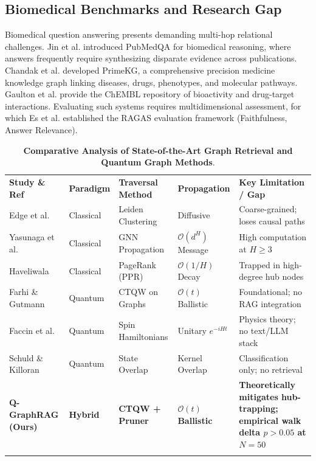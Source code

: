 \documentclass{llncs}
\begin{document}
\subsection{Biomedical Benchmarks and Research Gap}
Biomedical question answering presents demanding multi-hop relational challenges. Jin et al. \cite{jin2019pubmedqa} introduced PubMedQA for biomedical reasoning, where answers frequently require synthesizing disparate evidence across publications. Chandak et al. \cite{chandak2023building} developed PrimeKG, a comprehensive precision medicine knowledge graph linking diseases, drugs, phenotypes, and molecular pathways. Gaulton et al. \cite{gaulton2012chembl} provide the ChEMBL repository of bioactivity and drug-target interactions. Evaluating such systems requires multidimensional assessment, for which Es et al. \cite{es2023ragas} established the RAGAS evaluation framework (Faithfulness, Answer Relevance).

\begin{table}[t]
\centering
\small
\caption{\textbf{Comparative Analysis of State-of-the-Art Graph Retrieval and Quantum Graph Methods}.}
\label{tab:literature_survey}
\begin{tabular}{p{2.8cm}p{1.6cm}p{2.2cm}p{2.2cm}p{2.8cm}}
\hline\noalign{\smallskip}
\textbf{Study \& Ref} & \textbf{Paradigm} & \textbf{Traversal Method} & \textbf{Propagation} & \textbf{Key Limitation / Gap} \\
\noalign{\smallskip}\hline\noalign{\smallskip}
Edge et al. \cite{edge2024graphrag} & Classical & Leiden Clustering & Diffusive & Coarse-grained; loses causal paths \\
Yasunaga et al. \cite{yasunaga2021qagnn} & Classical & GNN Propagation & $\mathcal{O}(d^H)$ Message & High computation at $H \ge 3$ \\
Haveliwala \cite{haveliwala2002topic} & Classical & PageRank (PPR) & $\mathcal{O}(1/H)$ Decay & Trapped in high-degree hub nodes \\
Farhi \& Gutmann \cite{farhi1998quantum} & Quantum & CTQW on Graphs & $\mathcal{O}(t)$ Ballistic & Foundational; no RAG integration \\
Faccin et al. \cite{faccin2013degree} & Quantum & Spin Hamiltonians & Unitary $e^{-iHt}$ & Physics theory; no text/LLM stack \\
Schuld \& Killoran \cite{schuld2019quantum} & Quantum & State Overlap & Kernel Overlap & Classification only; no retrieval \\
\textbf{Q-GraphRAG (Ours)} & \textbf{Hybrid} & \textbf{CTQW + Pruner} & \textbf{$\mathcal{O}(t)$ Ballistic} & \textbf{Theoretically mitigates hub-trapping; empirical walk delta $p>0.05$ at $N=50$} \\
\noalign{\smallskip}\hline
\end{tabular}
\end{table}
\end{document}
